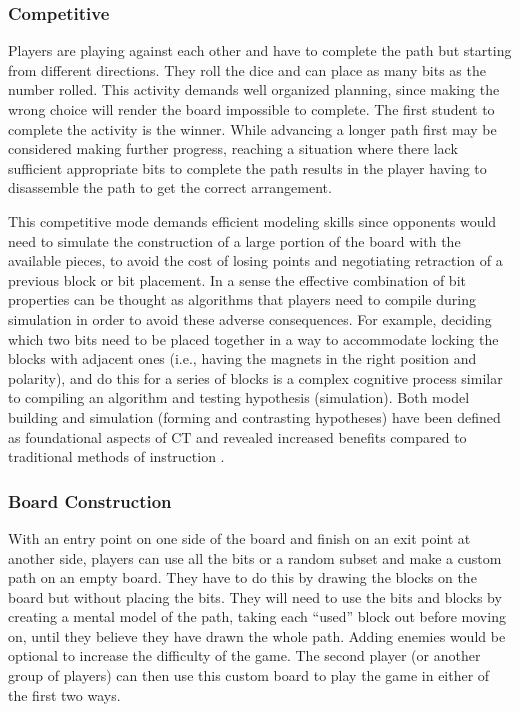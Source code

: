 \documentclass{acm_proc_article-sp}
\begin{document}
\subsubsection{Competitive}
\label{sec:competition}
Players are playing against each other and have to complete the path but starting from different directions.
They roll the dice and can place as many bits as the number rolled.
This activity demands well organized planning, since making the wrong choice will render the board impossible to complete.
The first student to complete the activity is the winner.
While advancing a longer path first may be considered making further progress, reaching a situation where there lack sufficient appropriate bits to complete the path results in the player having to disassemble the path to get the correct arrangement.

This competitive mode demands efficient modeling skills since opponents would need to simulate the construction of a large portion of the board with the available pieces, to avoid the cost of losing points and negotiating retraction of a previous block or bit placement.
In a sense the effective combination of bit properties can be thought as algorithms that players need to compile during simulation in order to avoid these adverse consequences.
For example, deciding which two bits need to be placed together in a way to accommodate locking the blocks with adjacent ones (i.e., having the magnets in the right position and polarity), and do this for a series of blocks is a complex cognitive process similar to compiling an algorithm and testing hypothesis (simulation).
Both model building and simulation (forming and contrasting hypotheses) have been defined as foundational aspects of CT and revealed increased benefits compared to traditional methods of instruction \cite{wilensky2006thinking}.

\subsubsection{Board Construction}
\label{sec:construction}
With an entry point on one side of the board and finish on an exit point at another side, players can use all the bits or a random subset and make a custom path on an empty board.
They have to do this by drawing the blocks on the board but without placing the bits.
They will need to use the bits and blocks by creating a mental model of the path, taking each ``used'' block out before moving on, until they believe they have drawn the whole path.
Adding enemies would be optional to increase the difficulty of the game.
The second player (or another group of players) can then use this custom board to play the game in either of the first two ways.
\end{document}
